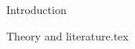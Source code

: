\documentclass[12pt]{article}
\begin{document}
{Introduction}


{Theory and literature.tex}
\end{document}
